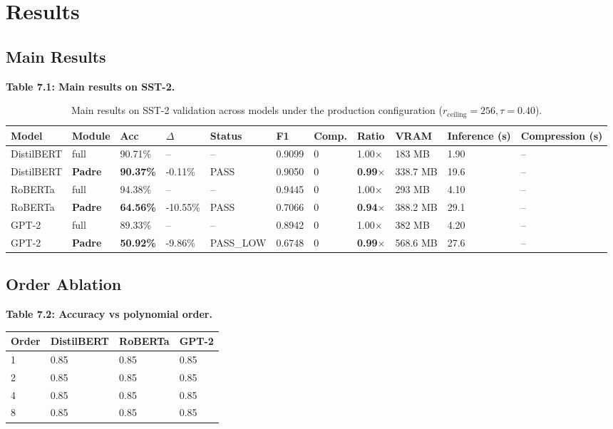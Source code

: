 \section{Results}

\subsection{Main Results}

\textbf{Table 7.1: Main results on SST-2.}

\begin{table}[t]
\centering
\small
\begin{tabular}{lllllllllll}
\toprule
\textbf{Model} & \textbf{Module} & \textbf{Acc} & \textbf{$\Delta$} & \textbf{Status} & \textbf{F1} & \textbf{Comp.} & \textbf{Ratio} & \textbf{VRAM} & \textbf{Inference (s)} & \textbf{Compression (s)} \\
\midrule
DistilBERT & full & 90.71\% & -- & -- & 0.9099 & 0 & 1.00$\times$ & 183 MB & 1.90 & -- \\
DistilBERT & \textbf{Padre} & \textbf{90.37\%} & -0.11\% & PASS & 0.9050 & 0 & \textbf{0.99$\times$} & 338.7 MB & 19.6 & -- \\
RoBERTa & full & 94.38\% & -- & -- & 0.9445 & 0 & 1.00$\times$ & 293 MB & 4.10 & -- \\
RoBERTa & \textbf{Padre} & \textbf{64.56\%} & -10.55\% & PASS & 0.7066 & 0 & \textbf{0.94$\times$} & 388.2 MB & 29.1 & -- \\
GPT-2 & full & 89.33\% & -- & -- & 0.8942 & 0 & 1.00$\times$ & 382 MB & 4.20 & -- \\
GPT-2 & \textbf{Padre} & \textbf{50.92\%} & -9.86\% & PASS_LOW & 0.6748 & 0 & \textbf{0.99$\times$} & 568.6 MB & 27.6 & -- \\
\bottomrule
\end{tabular}
\caption{Main results on SST-2 validation across models under the production configuration ($r_{\mathrm{ceiling}}=256, \tau=0.40$).}
\label{tab:main_sst2}
\end{table}

\subsection{Order Ablation}

\textbf{Table 7.2: Accuracy vs polynomial order.}

\begin{table}[H]
\centering
\small
\begin{tabular}{llll}
\toprule
\textbf{Order} & \textbf{DistilBERT} & \textbf{RoBERTa} & \textbf{GPT-2} \\
\midrule
1 & 0.85 & 0.85 & 0.85 \\
2 & 0.85 & 0.85 & 0.85 \\
4 & 0.85 & 0.85 & 0.85 \\
8 & 0.85 & 0.85 & 0.85 \\
\bottomrule
\end{tabular}
\end{table}

